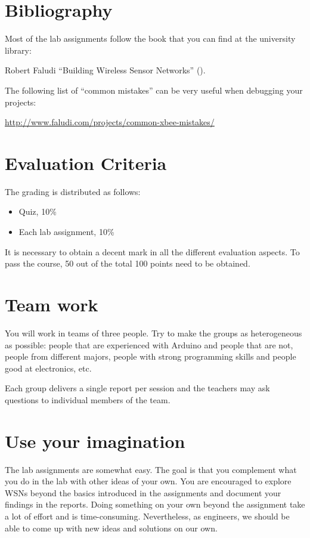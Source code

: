 \section{Bibliography}

Most of the lab assignments follow the book that you can find at the university library:

Robert Faludi ``Building Wireless Sensor Networks'' (\cite{faludi2010bws}).

The following list of ``common mistakes'' can be very useful when debugging your projects:

\url{http://www.faludi.com/projects/common-xbee-mistakes/}


\section{Evaluation Criteria}

The grading is distributed as follows:
\begin{itemize}
\item Quiz, 10\%
\item Each lab assignment, 10\%
\end{itemize}

It is necessary to obtain a decent mark in all the different evaluation aspects.
To pass the course, 50 out of the total 100 points need to be obtained.

\section{Team work}

You will work in teams of three people.
Try to make the groups as heterogeneous as possible: people that are experienced with Arduino and people that are not, people from different majors, people with strong programming skills and people good at electronics, etc.

Each group delivers a single report per session and the teachers may ask questions to individual members of the team.

\section{Use your imagination}
The lab assignments are somewhat easy.
The goal is that you complement what you do in the lab with other ideas of your own.
You are encouraged to explore WSNs beyond the basics introduced in the assignments and document your findings in the reports.
Doing something on your own beyond the assignment take a lot of effort and is time-consuming.
Nevertheless, as engineers, we should be able to come up with new ideas and solutions on our own.

